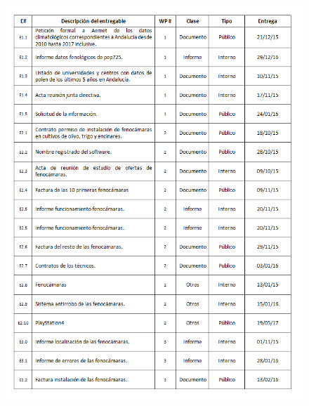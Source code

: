 \documentclass[12pt,oneside,a4paper]{article}
\numberwithin{figure}{section}
\begin{document}
\begin{figure}[H]
\begin{center}
\includegraphics[scale=0.8]{Entregablesp1.png}
\end{center}
\end{figure}
\end{document}
